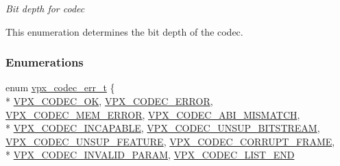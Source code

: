 \begin{DoxyCompactItemize}
\begin{DoxyCompactList}\small\item\em Bit depth for codec
\begin{DoxyItemize}
\item This enumeration determines the bit depth of the codec. 
\end{DoxyItemize}\end{DoxyCompactList}\end{DoxyCompactItemize}
\subsubsection*{Enumerations}
\begin{DoxyCompactItemize}
\item 
enum \hyperlink{group__codec_gada1084710837ad363b92f2379dd2b8d2}{vpx\+\_\+codec\+\_\+err\+\_\+t} \{ \\*
\hyperlink{group__codec_ggada1084710837ad363b92f2379dd2b8d2af1dcde74b1c5ff7b29f31246dfd90986}{V\+P\+X\+\_\+\+C\+O\+D\+E\+C\+\_\+\+OK}, 
\hyperlink{group__codec_ggada1084710837ad363b92f2379dd2b8d2abd8a8f9c2588adab5d764d957e265135}{V\+P\+X\+\_\+\+C\+O\+D\+E\+C\+\_\+\+E\+R\+R\+OR}, 
\hyperlink{group__codec_ggada1084710837ad363b92f2379dd2b8d2a96c6d2600dc0ec25c2cb798e8d2f4760}{V\+P\+X\+\_\+\+C\+O\+D\+E\+C\+\_\+\+M\+E\+M\+\_\+\+E\+R\+R\+OR}, 
\hyperlink{group__codec_ggada1084710837ad363b92f2379dd2b8d2afe8f723512f728bc518bbfba3b96d324}{V\+P\+X\+\_\+\+C\+O\+D\+E\+C\+\_\+\+A\+B\+I\+\_\+\+M\+I\+S\+M\+A\+T\+CH}, 
\\*
\hyperlink{group__codec_ggada1084710837ad363b92f2379dd2b8d2a4470784ba5a3ef84dc0697d5489dd292}{V\+P\+X\+\_\+\+C\+O\+D\+E\+C\+\_\+\+I\+N\+C\+A\+P\+A\+B\+LE}, 
\hyperlink{group__codec_ggada1084710837ad363b92f2379dd2b8d2afff886e57782098a3df13d4e349ca973}{V\+P\+X\+\_\+\+C\+O\+D\+E\+C\+\_\+\+U\+N\+S\+U\+P\+\_\+\+B\+I\+T\+S\+T\+R\+E\+AM}, 
\hyperlink{group__codec_ggada1084710837ad363b92f2379dd2b8d2a8a86701e65d826d82651537aadd6c539}{V\+P\+X\+\_\+\+C\+O\+D\+E\+C\+\_\+\+U\+N\+S\+U\+P\+\_\+\+F\+E\+A\+T\+U\+RE}, 
\hyperlink{group__codec_ggada1084710837ad363b92f2379dd2b8d2a29d03c009e0479dbf4ecbd8db1011b85}{V\+P\+X\+\_\+\+C\+O\+D\+E\+C\+\_\+\+C\+O\+R\+R\+U\+P\+T\+\_\+\+F\+R\+A\+ME}, 
\\*
\hyperlink{group__codec_ggada1084710837ad363b92f2379dd2b8d2ab5857f7b5f03f8ca164fab8843a979df}{V\+P\+X\+\_\+\+C\+O\+D\+E\+C\+\_\+\+I\+N\+V\+A\+L\+I\+D\+\_\+\+P\+A\+R\+AM}, 
\hyperlink{group__codec_ggada1084710837ad363b92f2379dd2b8d2a452450a5adfcc14ef8a0ac12611dae21}{V\+P\+X\+\_\+\+C\+O\+D\+E\+C\+\_\+\+L\+I\+S\+T\+\_\+\+E\+ND}

\end{DoxyCompactItemize}
